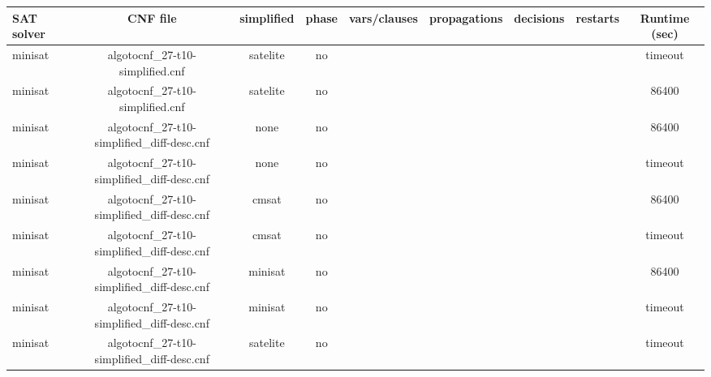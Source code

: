 \begin{appendices}
\begin{table}[p]
  \begin{center}
    \begin{tabular}{l|cccccccc}
        \textbf{SAT solver} & \textbf{CNF file} & \textbf{simplified} & \textbf{phase} & \textbf{vars/clauses} & \textbf{propagations} & \textbf{decisions} & \textbf{restarts} & \textbf{Runtime (sec)} \\
      \hline
  minisat                        & algotocnf\_27-t10-simplified.cnf & satelite   & no    &            &           &           &            & timeout \\ %
  minisat                        & algotocnf\_27-t10-simplified.cnf & satelite   & no    &            &           &           &            & 86400 \\ %
  minisat                        & algotocnf\_27-t10-simplified\_diff-desc.cnf & none       & no    &            &           &           &            & 86400 \\ %
  minisat                        & algotocnf\_27-t10-simplified\_diff-desc.cnf & none       & no    &            &           &           &            & timeout \\ %
  minisat                        & algotocnf\_27-t10-simplified\_diff-desc.cnf & cmsat      & no    &            &           &           &            & 86400 \\ %
  minisat                        & algotocnf\_27-t10-simplified\_diff-desc.cnf & cmsat      & no    &            &           &           &            & timeout \\ %
  minisat                        & algotocnf\_27-t10-simplified\_diff-desc.cnf & minisat    & no    &            &           &           &            & 86400 \\ %
  minisat                        & algotocnf\_27-t10-simplified\_diff-desc.cnf & minisat    & no    &            &           &           &            & timeout \\ %
  minisat                        & algotocnf\_27-t10-simplified\_diff-desc.cnf & satelite   & no    &            &           &           &            & timeout \\ %

\end{tabular}
\end{center}
\end{table}
\end{appendices}
